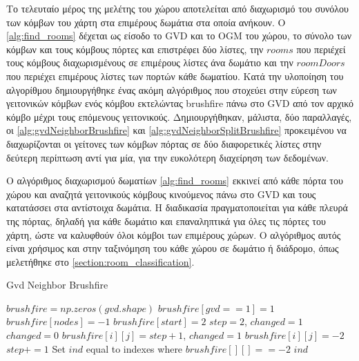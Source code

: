 Το τελευταίο μέρος της μελέτης του χώρου αποτελείται από διαχωρισμό του συνόλου των κόμβων του χάρτη στα επιμέρους δωμάτια στα οποία ανήκουν. Ο \autoref{alg:find_rooms} δέχεται ως είσοδο το GVD και το OGM του χώρου, το σύνολο των κόμβων και τους κόμβους πόρτες και επιστρέφει δύο λίστες, την $rooms$ που περιέχεί τους κόμβους διαχωρισμένους σε επιμέρους λίστες άνα δωμάτιο και την $roomDoors$ που περιέχει επιμέρους λίστες των πορτών κάθε δωματίου. Κατά την υλοποίηση του αλγορίθμου δημιουργήθηκε ένας ακόμη αλγόριθμος που στοχεύει στην εύρεση των γειτονικών κόμβων ενός κόμβου εκτελώντας brushfire πάνω στο GVD από τον αρχικό κόμβο μέχρι τους επόμενους γειτονικούς. Δημιουργήθηκαν, μάλιστα, δύο παραλλαγές, οι \ref{alg:gvdNeighborBrushfire} και \ref{alg:gvdNeighborSplitBrushfire} προκειμένου να διαχωρίζονται οι γείτονες των κόμβων πόρτας σε δύο διαφορετικές λίστες στην δεύτερη περίπτωση αντί για μία, για την ευκολότερη διαχείρηση των δεδομένων. 

Ο αλγόριθμος διαχωρισμού δωματίων \ref{alg:find_rooms} εκκινεί από κάθε πόρτα του χώρου και αναζητά γειτονικούς κόμβους κινούμενος πάνω στο GVD και τους κατατάσσει στα αντίστοιχα δωμάτια. Η διαδικασία πραγματοποιείται για κάθε πλευρά της πόρτας, δηλαδή για κάθε δωμάτιο και επαναληπτικά για όλες τις πόρτες του χάρτη, ώστε να καλυφθούν όλοι κόμβοι των επιμέρους χώρων. Ο αλγόριθμος αυτός είναι χρήσιμος και στην ταξινόμηση του κάθε χώρου σε δωμάτιο ή διάδρομο, όπως μελετήθηκε στο \ref{section:room_classification}.


\begin{algorithm}[!htb]
\caption{Gvd Neighbor Brushfire}
\label{alg:gvdNeighborBrushfire}
\begin{algorithmic}[1]
        \State $brushfire = np.zeros(gvd.shape)$
        \State $brushfire[gvd == 1] = 1$
        \State $brushfire[nodes] = -1$
        \State $brushfire[start] = 2$
        \State $step = 2$, $changed = 1$
            \State $changed = 0$
                        \State $brushfire[i][j] = step + 1$, $changed = 1$
                        \State $brushfire[i][j] = -2$
                    \EndIf
                \EndFor
            \EndFor
            \State $step += 1$
        \EndWhile
        \State Set $ind$ equal to indexes where $brushfire[][] == -2$   
        \State \Return $ind$
\end{algorithmic}
\end{algorithm}


